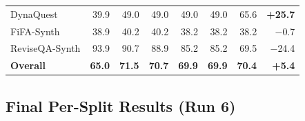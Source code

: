 \documentclass[11pt,a4paper]{article}
\begin{document}
\begin{table}[H]
\begin{tabular}{l*{6}{r}r}
DynaQuest
    & \textcolor{failred}{39.9}
    & \textcolor{failred}{49.0}
    & \textcolor{failred}{49.0}
    & \textcolor{failred}{49.0}
    & \textcolor{failred}{49.0}
    & 65.6
    & \textbf{+25.7} \\
FiFA-Synth
    & \textcolor{failred}{38.9}
    & \textcolor{failred}{40.2}
    & \textcolor{failred}{40.2}
    & \textcolor{failred}{38.2}
    & \textcolor{failred}{38.2}
    & \textcolor{failred}{38.2}
    & $-$0.7 \\
ReviseQA-Synth
    & \textcolor{nearblue}{93.9}
    & 90.7
    & \textcolor{nearblue}{88.9}
    & \textcolor{nearblue}{85.2}
    & \textcolor{nearblue}{85.2}
    & 69.5
    & $-$24.4 \\
\midrule
\textbf{Overall}
    & \textbf{65.0}
    & \textbf{71.5}
    & \textbf{70.7}
    & \textbf{69.9}
    & \textbf{69.9}
    & \textbf{70.4}
    & \textbf{+5.4} \\
\bottomrule
\end{tabular}
\end{table}


\subsection{Final Per-Split Results (Run 6)}
\end{document}
